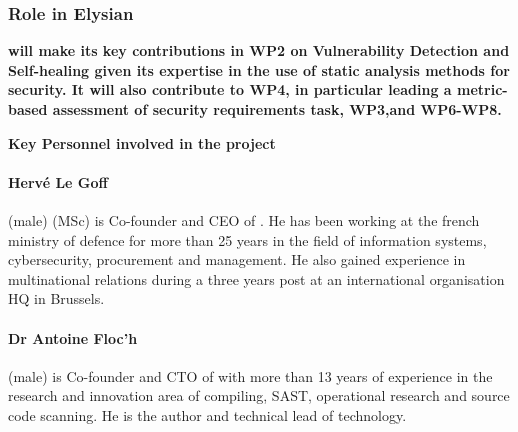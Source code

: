 \documentclass[a4paper,11pt]{article}
\begin{document}
\vspace{10pt}
\subsubsection*{Role in Elysian}
\textbf{\YAGshort{} will make its key contributions in  WP2 on Vulnerability Detection and Self-healing given its expertise in the use of static analysis methods for security. It will also contribute to WP4, in particular leading a metric-based assessment of security requirements task, WP3,and  WP6-WP8.
 }

\vspace{10pt}

\textbf{Key Personnel involved in the project}

\paragraph{Hervé Le Goff} (male) (MSc) is Co-founder and CEO of \YAGlong{}. He has been working at the french ministry of defence for more than 25 years in the field of information systems, cybersecurity, procurement and management. He also gained experience in multinational relations during a three years post at an international organisation HQ in Brussels.

\vspace{10pt}

\paragraph{Dr Antoine Floc'h} (male)  is Co-founder and CTO of \YAGlong{} with more than 13 years of experience in the research and innovation area of compiling, SAST, operational research and source code scanning. He is the author and technical lead of \YAGlong{} technology.
\end{document}
